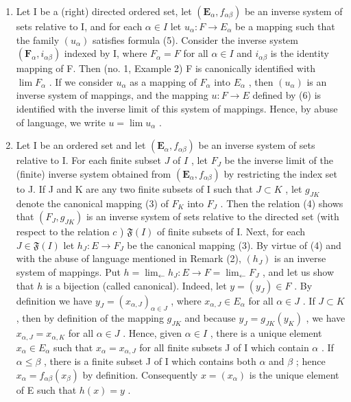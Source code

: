 \begin{enumerate}
\def\labelenumi{(\arabic{enumi})}
\setcounter{enumi}{1}
\item
  Let I be a (right) directed ordered set, let \((\mathbf{E}_{\alpha}, f_{\alpha\beta})\) be an inverse system of sets relative to I, and for each \(\alpha \in I\) let \(u_{\alpha}: F \to E_{\alpha}\) be a mapping such that the family \((u_{\alpha})\) satisfies formula (5). Consider the inverse system \((\mathbf{F}_{\alpha}, i_{\alpha\beta})\) indexed by I, where \(F_{\alpha} = F\) for all \(\alpha \in I\) and \(i_{\alpha\beta}\) is the identity mapping of F. Then (no. 1, Example 2) F is canonically identified with \(\lim F_{\alpha}\) . If we consider \(u_{\alpha}\) as a mapping of \(F_{\alpha}\) into \(E_{\alpha}\) , then \((u_{\alpha})\) is an inverse system of mappings, and the mapping \(u: F \to E\) defined by (6) is identified with the inverse limit of this system of mappings. Hence, by abuse of language, we write \(u = \lim u_{\alpha}\) .
\item
  Let I be an ordered set and let \((\mathbf{E}_{\alpha}, f_{\alpha \beta})\) be an inverse system of sets relative to I. For each finite subset \(J\) of \(I\) , let \(F_{J}\) be the inverse limit of the (finite) inverse system obtained from \((\mathbf{E}_{\alpha}, f_{\alpha \beta})\) by restricting the index set to J. If J and K are any two finite subsets of I such that \(J \subset K\) , let \(g_{JK}\) denote the canonical mapping (3) of \(F_{K}\) into \(F_{J}\) . Then the relation (4) shows that \((F_{J}, g_{JK})\) is an inverse system of sets relative to the directed set (with respect to the relation \(c\) ) \(\mathfrak{F}(I)\) of finite subsets of I. Next, for each \(J \in \mathfrak{F}(I)\) let \(h_{J}: E \to F_{J}\) be the canonical mapping (3). By virtue of (4) and with the abuse of language mentioned in Remark (2), \((h_{J})\) is an inverse system of mappings. Put \(h = \lim_{\leftarrow} h_{J}: E \to F = \lim_{\leftarrow} F_{J}\) , and let us show that \(h\) is a bijection (called canonical). Indeed, let \(y = (y_{J}) \in F\) . By definition we have \(y_{J} = (x_{\alpha, J})_{\alpha \in J}\) , where \(x_{\alpha, J} \in E_{\alpha}\) for all \(\alpha \in J\) . If \(J \subset K\) , then by definition of the mapping \(g_{JK}\) and because \(y_{J} = g_{JK}(y_{K})\) , we have \(x_{\alpha, J} = x_{\alpha, K}\) for all \(\alpha \in J\) . Hence, given \(\alpha \in I\) , there is a unique element \(x_{\alpha} \in E_{\alpha}\) such that \(x_{\alpha} = x_{\alpha, J}\) for all finite subsets J of I which contain \(\alpha\) . If \(\alpha \leqslant \beta\) , there is a finite subset J of I which contains both \(\alpha\) and \(\beta\) ; hence \(x_{\alpha} = f_{\alpha \beta}(x_{\beta})\) by definition. Consequently \(x = (x_{\alpha})\) is the unique element of E such that \(h(x) = y\) .
\end{enumerate}

